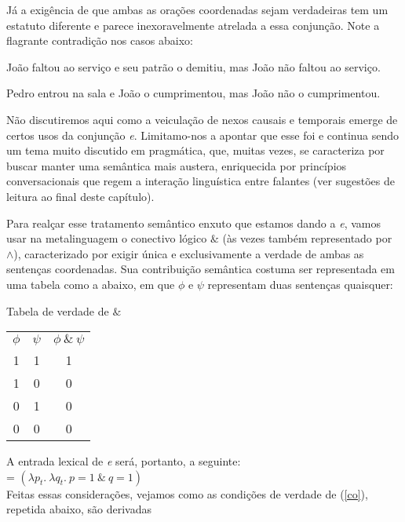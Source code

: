 Já a exigência de que ambas as orações coordenadas sejam verdadeiras tem um estatuto diferente e parece inexoravelmente atrelada a essa conjunção. Note a flagrante contradição nos casos abaixo:

\begin{exe}
	\ex João faltou ao serviço e seu patrão o demitiu, mas João não faltou ao serviço. \label{demct}
	
	\ex Pedro entrou na sala e João o cumprimentou, mas João não o cumprimentou. \label{cumct}	
\end{exe}

Não discutiremos aqui como a veiculação de nexos causais e temporais emerge de certos usos da conjunção \textit{e}. Limitamo-nos a apontar que esse foi e continua sendo um tema muito discutido em pragmática, que, muitas vezes, se caracteriza por buscar manter uma semântica mais austera, enriquecida por princípios conversacionais que regem a interação linguística entre falantes (ver sugestões de leitura ao final deste capítulo).

Para realçar esse tratamento semântico enxuto que estamos dando a \textit{e}, vamos usar na metalinguagem o conectivo lógico $\&$ (às vezes também representado por $\land$), caracterizado por exigir única e exclusivamente a verdade de ambas as sentenças coordenadas. Sua contribuição semântica costuma ser representada em uma tabela como a abaixo, em que $\phi$ e $\psi$ representam duas sentenças quaisquer:

\begin{exe}
	\ex Tabela de verdade de $\&$\\
	
	\begin{tabular}{c|c||c}
		$\phi$ & $\psi$ & $\phi\ \&\ \psi$ \\ 
		1 & 1 & 1 \\ 
		1 & 0 & 0 \\ 
		0 & 1 & 0 \\ 
		0 & 0 & 0 \\ 
	\end{tabular} 	
\end{exe}

\n A entrada lexical de \textit{e} será, portanto, a seguinte: \\

\n {} = $(\lambda p_{t}.\ \lambda q_{t}.\ p=1\ \&\
q=1)$\\ 

Feitas essas considerações, vejamos como as condi\-çõ\-es de verdade de (\ref{co}), repetida abaixo, são
derivadas\\

